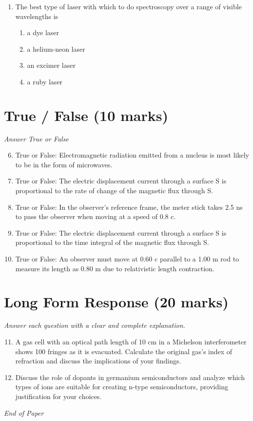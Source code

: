 \documentclass[12pt]{article}
\begin{document}
\begin{enumerate}[label=\arabic*.]
\begin{enumerate}[label=(\alph*)]
    \item 262 Hz
    \item 393 Hz
\end{enumerate}
\item The best type of laser with which to do spectroscopy over a range of visible wavelengths is
\begin{enumerate}[label=(\alph*)]
    \item a dye laser
    \item a helium-neon laser
    \item an excimer laser
    \item a ruby laser
\end{enumerate}
\end{enumerate}

\section*{True / False (10 marks)}
\textit{Answer True or False}
\begin{enumerate}[label=\arabic*.]
\setcounter{enumi}{5}
\item True or False: Electromagnetic radiation emitted from a nucleus is most likely to be in the form of microwaves.
\item True or False: The electric displacement current through a surface S is proportional to the rate of change of the magnetic flux through S.
\item True or False: In the observer's reference frame, the meter stick takes 2.5 ns to pass the observer when moving at a speed of 0.8 c.
\item True or False: The electric displacement current through a surface S is proportional to the time integral of the magnetic flux through S.
\item True or False: An observer must move at 0.60 c parallel to a 1.00 m rod to measure its length as 0.80 m due to relativistic length contraction.
\end{enumerate}

\section*{Long Form Response (20 marks)}
\textit{Answer each question with a clear and complete explanation.}
\begin{enumerate}[label=\arabic*.]
\setcounter{enumi}{10}
\item A gas cell with an optical path length of 10 cm in a Michelson interferometer shows 100 fringes as it is evacuated. Calculate the original gas's index of refraction and discuss the implications of your findings.
\item Discuss the role of dopants in germanium semiconductors and analyze which types of ions are suitable for creating n-type semiconductors, providing justification for your choices.
\end{enumerate}

\vfill
\noindent\textit{End of Paper}
\end{document}
